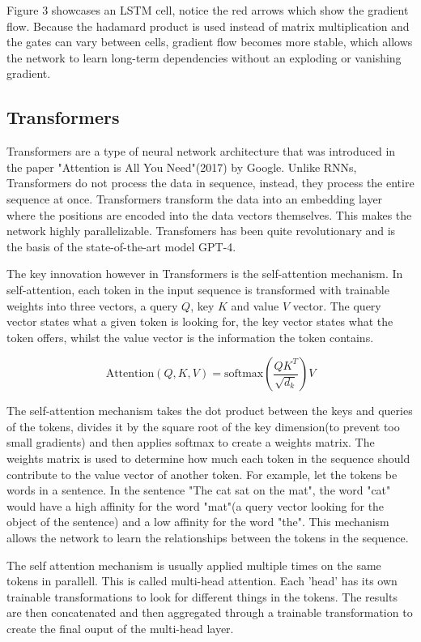 \documentclass[11pt]{article}
\begin{document}
Figure 3 showcases an LSTM cell, notice the red arrows which show the gradient flow. Because the hadamard product is used instead of matrix multiplication and the gates can vary between cells, gradient flow becomes more stable, which allows the network to learn long-term dependencies without an exploding or vanishing gradient.
\subsection{Transformers}

Transformers are a type of neural network architecture that was introduced in the paper "Attention is All You Need"(2017) by Google. Unlike RNNs, Transformers do not process the data in sequence, instead, they process the entire sequence at once. Transformers transform the data into an embedding layer where the positions are encoded into the data vectors themselves. This makes the network highly parallelizable. Transfomers has been quite revolutionary and is the basis of the state-of-the-art model GPT-4.

The key innovation however in Transformers is the self-attention mechanism. In self-attention, each token in the input sequence is transformed with trainable weights into three vectors, a query $Q$, key $K$ and value $V$ vector. The query vector states what a given token is looking for, the key vector states what the token offers, whilst the value vector is the information the token contains.

$$\text{Attention}(Q, K , V) = \text{softmax}(\frac{QK^T}{\sqrt{d_k}})V$$

The self-attention mechanism takes the dot product between the keys and queries of the tokens, divides it by the square root of the key dimension(to prevent too small gradients) and then applies softmax to create a weights matrix. The weights matrix is used to determine how much each token in the sequence should contribute to the value vector of another token. For example, let the tokens be words in a sentence. In the sentence "The cat sat on the mat", the word "cat" would have a high affinity for the word "mat"(a query vector looking for the object of the sentence) and a low affinity for the word "the". This mechanism allows the network to learn the relationships between the tokens in the sequence.

The self attention mechanism is usually applied multiple times on the same tokens in parallell. This is called multi-head attention. Each 'head' has its own trainable transformations to look for different things in the tokens. The results are then concatenated and then aggregated through a trainable transformation to create the final ouput of the multi-head layer.
\end{document}
